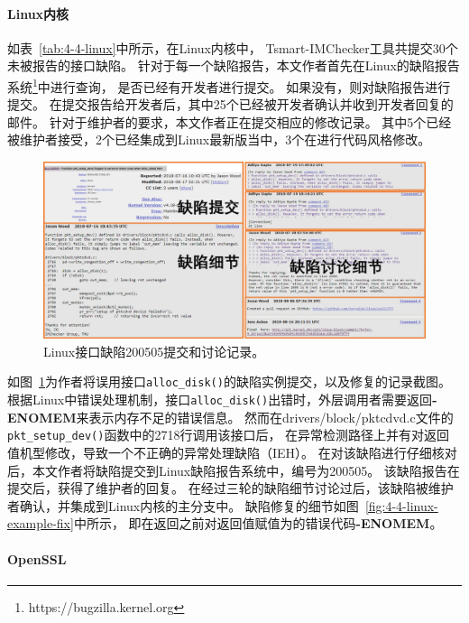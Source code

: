 

\paragraph{Linux内核}
如表~\ref{tab:4-4-linux}中所示，在Linux内核中，
Tsmart-IMChecker工具共提交30个未被报告的接口缺陷。
针对于每一个缺陷报告，本文作者首先在Linux的缺陷报告系统\footnote{https://bugzilla.kernel.org}中进行查询，
是否已经有开发者进行提交。
如果没有，则对缺陷报告进行提交。
在提交报告给开发者后，其中25个已经被开发者确认并收到开发者回复的邮件。
针对于维护者的要求，本文作者正在提交相应的修改记录。
其中5个已经被维护者接受，2个已经集成到Linux最新版当中，3个在进行代码风格修改。

\begin{figure}[t]
	\centering
	\includegraphics[width=\linewidth]{figures/cp4-linux-example.png}
	\caption{
		Linux接口缺陷200505提交和讨论记录。
	}
	\label{fig:4-4-linux-example}
\end{figure}




如图~\ref{fig:4-4-linux-example}为作者将误用接口\texttt{alloc\_disk()}的缺陷实例提交，以及修复的记录截图。
根据Linux中错误处理机制，接口\texttt{alloc\_disk()}出错时，外层调用者需要返回\textbf{-ENOMEM}来表示内存不足的错误信息。
然而在drivers/block/pktcdvd.c文件的\texttt{pkt\_setup\_dev()}函数中的2718行调用该接口后，
在异常检测路径上并有对返回值机型修改，导致一个不正确的异常处理缺陷（IEH）。
在对该缺陷进行仔细核对后，本文作者将缺陷提交到Linux缺陷报告系统中，编号为200505。
该缺陷报告在提交后，获得了维护者的回复。
在经过三轮的缺陷细节讨论过后，该缺陷被维护者确认，并集成到Linux内核的主分支中。
缺陷修复的细节如图~\ref{fig:4-4-linux-example-fix}中所示，
即在返回之前对返回值赋值为的错误代码\textbf{-ENOMEM}。


\paragraph{OpenSSL}



